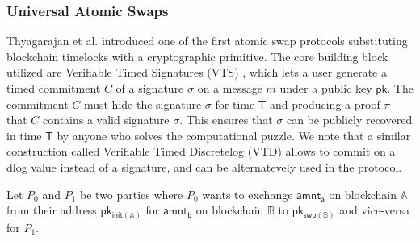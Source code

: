 \documentclass{article}      	%
\begin{document}
%

\subsubsection{Universal Atomic Swaps}


Thyagarajan et al. \cite{uas} introduced one of the first atomic swap protocols substituting blockchain timelocks with a cryptographic primitive. 
The core building block utilized are Verifiable Timed Signatures (VTS) \cite{vts}, which lets a user generate a timed commitment $C$ of a signature $\sigma$ on a message $m$ under a public key $\mathsf{pk}$. The commitment $C $ must hide the signature $\sigma$ for time $\mathsf{T}$ and producing a proof $\pi$ that $C$ contains a valid signature $\sigma$. This ensures that $\sigma$ can be publicly recovered in time $\mathsf{T}$ by anyone who solves the computational puzzle. We note that a similar construction called Verifiable Timed Discretelog (VTD) allows to commit on a dlog value instead of a signature, and can be alternatevely used in the protocol.

Let $P_0$ and $P_1$ be two parties where $P_0$ wants to exchange $\mathsf{amnt_a}$ on blockchain $\mathbb{A}$ from their address $\mathsf{pk_{init(\mathbb{A})}}$ for $\mathsf{amnt_b}$ on blockchain $\mathbb{B}$ to $\mathsf{pk_{swp(\mathbb{B})}}$ and vice-versa for $P_1$.
\end{document}
